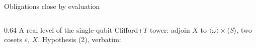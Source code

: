 \begin{frame}{Obligations close by evaluation}
\begin{columns}[c]
\begin{column}{0.64\textwidth}
\small A real level of the single-qubit Clifford+$T$ tower: adjoin $X$ to
$\langle\omega\rangle\times\langle S\rangle$, two cosets $\varepsilon$, $X$.
Hypothesis (2), verbatim:
\renewcommand{\AgdaCodeStyle}{\scriptsize}
\begin{code}%
\>[0]\AgdaSpace{}%
\AgdaSymbol{:}\AgdaSpace{}%
\AgdaSpace{}%
\AgdaSpace{}%
\AgdaSymbol{\{}\AgdaSpace{}%
\AgdaSymbol{\}}\AgdaSpace{}%
\AgdaSpace{}%
\AgdaSpace{}%
\AgdaOperator{\AgdaDatatype{===}}\AgdaSpace{}%
\AgdaSpace{}%
\AgdaSpace{}%
\AgdaSymbol{(}\AgdaSpace{}%
\AgdaSymbol{)}\AgdaSpace{}%
\AgdaSpace{}%
\AgdaSpace{}%
\AgdaOperator{\AgdaPostulate{\textasciitilde{}}}\AgdaSpace{}%
\AgdaSymbol{(}\AgdaSpace{}%
\AgdaSymbol{)}\AgdaSpace{}%
\AgdaSpace{}%
\<%
\\
\>[0]\AgdaSpace{}%
\AgdaSpace{}%
\AgdaSymbol{\{}\AgdaSymbol{\}}\AgdaSpace{}%
\AgdaSymbol{\{}\AgdaSymbol{\}}\AgdaSpace{}%
\AgdaSpace{}%
\AgdaSymbol{=}\AgdaSpace{}%
\AgdaSymbol{(}\AgdaSpace{}%
\AgdaSymbol{)}\AgdaSpace{}%
\AgdaOperator{\AgdaInductiveConstructor{,}}\AgdaSpace{}%
\<%
\\
\>[0]\AgdaSpace{}%
\AgdaSpace{}%
\AgdaSymbol{\{}\AgdaSymbol{\}}\AgdaSpace{}%
\AgdaSymbol{\{}\AgdaSymbol{\}}\AgdaSpace{}%
\AgdaSpace{}%
\AgdaSymbol{=}\AgdaSpace{}%
\AgdaSymbol{(}\AgdaSpace{}%
\AgdaSymbol{)}\AgdaSpace{}%
\AgdaOperator{\AgdaInductiveConstructor{,}}\AgdaSpace{}%
\<%
\\
\>[0]\AgdaSpace{}%
\AgdaSpace{}%
\AgdaSymbol{\{}\AgdaSymbol{\}}\AgdaSpace{}%
\AgdaSymbol{\{}\AgdaSymbol{\}}\AgdaSpace{}%
\AgdaSpace{}%
\AgdaSymbol{=}\AgdaSpace{}%

\end{code}
\end{column}
\end{columns}
\end{frame}
